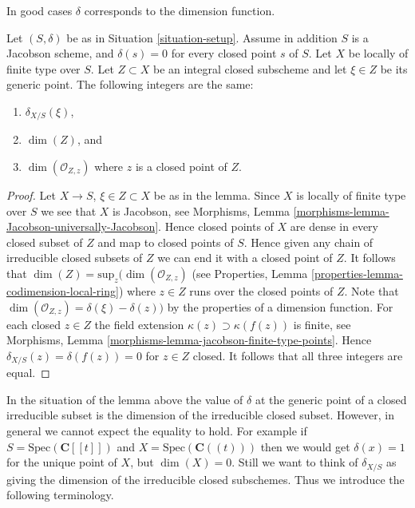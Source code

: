 \noindent
In good cases $\delta$ corresponds to the dimension function.

\begin{lemma}
\label{lemma-delta-is-dimension}
Let $(S, \delta)$ be as in Situation \ref{situation-setup}.
Assume in addition $S$ is a Jacobson scheme, and $\delta(s) = 0$ for every
closed point $s$ of $S$. Let $X$ be locally of finite type over $S$.
Let $Z \subset X$ be an integral closed subscheme and let
$\xi \in Z$ be its generic point. The following integers are the same:
\begin{enumerate}
\item $\delta_{X/S}(\xi)$,
\item $\dim(Z)$, and
\item $\dim(\mathcal{O}_{Z, z})$ where $z$ is a closed point of $Z$.
\end{enumerate}
\end{lemma}

\begin{proof}
Let $X \to S$, $\xi \in Z \subset X$ be as in the lemma.
Since $X$ is locally of finite type over $S$ we see that
$X$ is Jacobson, see
Morphisms, Lemma \ref{morphisms-lemma-Jacobson-universally-Jacobson}.
Hence closed points of $X$ are dense in every closed subset of $Z$
and map to closed points of $S$. Hence given any chain
of irreducible closed subsets of $Z$ we can end it with a closed point of $Z$.
It follows that $\dim(Z) = \text{sup}_z(\dim(\mathcal{O}_{Z, z})$
(see Properties, Lemma \ref{properties-lemma-codimension-local-ring})
where $z \in Z$ runs over the closed points of $Z$.
Note that $\dim(\mathcal{O}_{Z, z}) = \delta(\xi) - \delta(z))$
by the properties of a dimension function.
For each closed $z \in Z$ the field extension
$\kappa(z) \supset \kappa(f(z))$ is finite, see Morphisms,
Lemma \ref{morphisms-lemma-jacobson-finite-type-points}.
Hence $\delta_{X/S}(z) = \delta(f(z)) = 0$ for $z \in Z$ closed.
It follows that all three integers are equal.
\end{proof}

\noindent
In the situation of the lemma above the
value of $\delta$ at the generic point of a closed irreducible subset
is the dimension of the irreducible closed subset.
However, in general we cannot expect the equality to hold.
For example if $S = \text{Spec}(\mathbf{C}[[t]])$ and
$X = \text{Spec}(\mathbf{C}((t)))$ then we would get
$\delta(x) = 1$ for the unique point of $X$, but $\dim(X) = 0$.
Still we want to think of $\delta_{X/S}$ as giving the
dimension of the irreducible closed subschemes. Thus we introduce
the following terminology.

